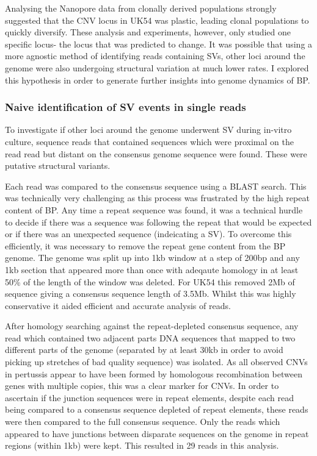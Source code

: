 \documentclass{article}
\begin{document}
Analysing the Nanopore data from clonally derived populations strongly suggested that the CNV locus in UK54 was plastic, leading clonal populations to quickly diversify. These analysis and experiments, however, only studied one specific locus- the locus that was predicted to change. It was possible that using a more agnostic method of identifying reads containing SVs, other loci around the genome were also undergoing structural variation at much lower rates. I explored this hypothesis in order to generate further insights into genome dynamics of BP.


\subsubsection{Naive identification of SV events in single reads}

To investigate if other loci around the genome underwent SV during in-vitro culture, sequence reads that contained sequences which were proximal on the read read but distant on the consensus genome sequence were found. These were putative structural variants. 

Each read was compared to the  consensus sequence  using a BLAST search. This was technically very challenging as this process was frustrated by the high repeat content of BP. Any time a repeat sequence was found, it was a technical hurdle to decide if there was a sequence was following the repeat that would be expected or if there was an unexpected sequence (indeicating a SV). To overcome this efficiently, it was necessary to remove the repeat gene content from the BP genome. The genome was split up into 1kb window at a step of 200bp and any 1kb section that appeared more than once with adeqaute homology in at least 50\% of the length of the window was deleted. For UK54 this removed 2Mb of sequence giving a consensus sequence length of 3.5Mb. Whilst this was highly conservative it aided efficient and accurate analysis of reads.

After homology searching against the repeat-depleted consensus sequence, any read which contained two adjacent parts DNA sequences that mapped to two different parts of the genome (separated by at least 30kb in order to avoid picking up stretches of bad quality sequence) was isolated. As all observed CNVs in pertussis appear to have been formed by homologous recombination between genes with multiple copies, this was a clear marker for CNVs. In order to ascertain if the junction sequences were in repeat elements, despite each read being compared to a consensus sequence depleted of repeat elements, these reads were then compared to the full consensus sequence. Only the reads which appeared to have junctions between disparate sequences on the genome in repeat regions (within 1kb) were kept. This resulted in 29 reads in this analysis.
\end{document}
